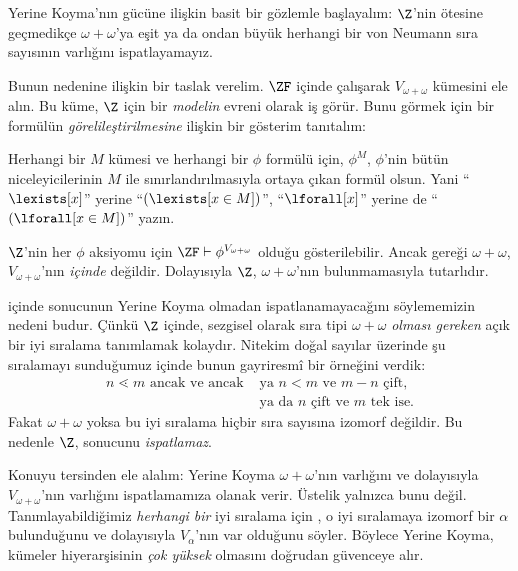 


Yerine Koyma'nın gücüne ilişkin basit bir gözlemle başlayalım: $\Z$'nin
ötesine geçmedikçe $\omega + \omega$'ya eşit ya da ondan büyük herhangi bir
von Neumann sıra sayısının varlığını ispatlayamayız.

Bunun nedenine ilişkin bir taslak verelim. $\ZF$ içinde çalışarak
$V_{\omega+\omega}$ kümesini ele alın. Bu küme, $\Z$ için bir \emph{modelin}
evreni olarak iş görür. Bunu görmek için bir formülün
\emph{görelileştirilmesine} ilişkin bir gösterim tanıtalım:
\begin{defn}
	Herhangi bir $M$ kümesi ve herhangi bir $\phi$ formülü için, $\phi^M$,
	$\phi$'nin bütün niceleyicilerinin $M$ ile sınırlandırılmasıyla ortaya
	çıkan formül olsun. Yani ``$\lexists[x]$'' yerine
	``$(\lexists[x \in M])$'', ``$\lforall[x]$'' yerine de
	``$(\lforall[x \in M])$'' yazın.
\end{defn}\noindent
$\Z$'nin her $\phi$ aksiyomu için $\ZF \vdash
\phi^{V_{\omega+\omega}}$ olduğu gösterilebilir. Ancak
 gereği $\omega+\omega$,
$V_{\omega+\omega}$'nın \emph{içinde} değildir. Dolayısıyla $\Z$,
$\omega+\omega$'nın bulunmamasıyla tutarlıdır.

 içinde
 sonucunun Yerine Koyma
olmadan ispatlanamayacağını söylememizin nedeni budur. Çünkü $\Z$ içinde,
sezgisel olarak sıra tipi $\omega+\omega$ \emph{olması gereken} açık bir iyi
sıralama tanımlamak kolaydır. Nitekim doğal sayılar üzerinde şu sıralamayı
sunduğumuz  içinde bunun gayriresmî bir örneğini
verdik:
\begin{align*}
	n \lessdot m \text{ ancak ve ancak }&\text{ya }n < m\text{ ve }m-n\text{ çift,}\\
	& \text{ya da $n$ çift ve $m$ tek ise.}
\end{align*}
Fakat $\omega+\omega$ yoksa bu iyi sıralama hiçbir sıra sayısına izomorf
değildir. Bu nedenle $\Z$, 
sonucunu \emph{ispatlamaz}.

Konuyu tersinden ele alalım: Yerine Koyma $\omega+\omega$'nın varlığını ve
dolayısıyla $V_{\omega+\omega}$'nın varlığını ispatlamamıza olanak verir.
Üstelik yalnızca bunu değil. Tanımlayabildiğimiz \emph{herhangi bir} iyi
sıralama için , o iyi
sıralamaya izomorf bir $\alpha$ bulunduğunu ve dolayısıyla $V_\alpha$'nın
var olduğunu söyler. Böylece Yerine Koyma, kümeler hiyerarşisinin
\emph{çok yüksek} olmasını doğrudan güvenceye alır.

